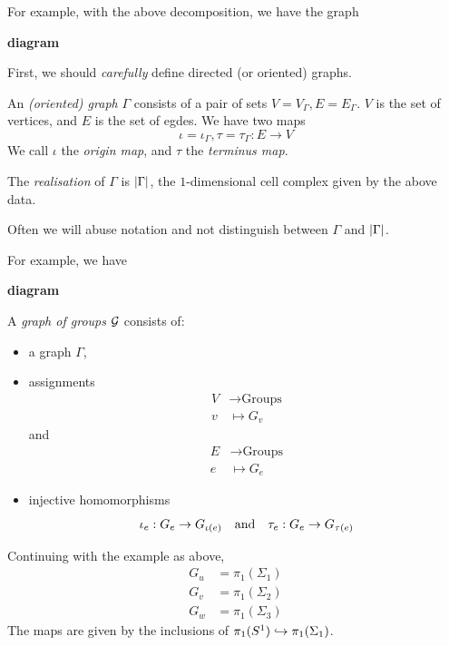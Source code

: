 \documentclass{article}
\begin{document}
For example, with the above decomposition, we have the graph

\textbf{diagram}

\lec

First, we should \emph{carefully} define directed (or oriented) graphs.

\begin{definition}
     An \emph{(oriented) graph} \(\Gamma\) consists of a pair of sets \(V = V_\Gamma, E = E_\Gamma\). \(V\) is the set of vertices, and \(E\) is the set of egdes. We have two maps
    \[\iota = \iota_\Gamma, \tau = \tau_\Gamma : E \to V\]
    We call \(\iota\) the \emph{origin map}, and \(\tau\) the \emph{terminus map}. 
    
    The \emph{realisation} of \(\Gamma\) is \(\abs{\Gamma}\), the \(1\)-dimensional cell complex given by the above data.
\end{definition}

Often we will abuse notation and not distinguish between \(\Gamma\) and \(\abs{\Gamma}\).

\begin{example}
    For example, we have

    \textbf{diagram}
\end{example}

\begin{definition}
    A \emph{graph of groups} \(\mathcal{G}\) consists of:
    \begin{itemize}
        \item a graph \(\Gamma\),
        \item assignments
        \begin{align*}
            V &\to \text{Groups} \\
            v &\mapsto G_v
        \end{align*}
        and
        \begin{align*}
            E &\to \text{Groups} \\
            e &\mapsto G_e
        \end{align*}
        \item injective homomorphisms
        \[\iota_e : G_e \to G_{\iota(e)} \qqtext{and} \tau_e : G_e \to G_{\tau(e)}\]
    \end{itemize}
\end{definition}

\begin{example}
    Continuing with the example as above,
    \begin{align*}
        G_u &= \pi_1(\Sigma_1) \\
        G_v &= \pi_1(\Sigma_2) \\
        G_w &= \pi_1(\Sigma_3)
    \end{align*}
    The maps are given by the inclusions of \(\pi_1(S^1) \hookrightarrow \pi_1(\Sigma_1)\).
\end{example}
\end{document}
